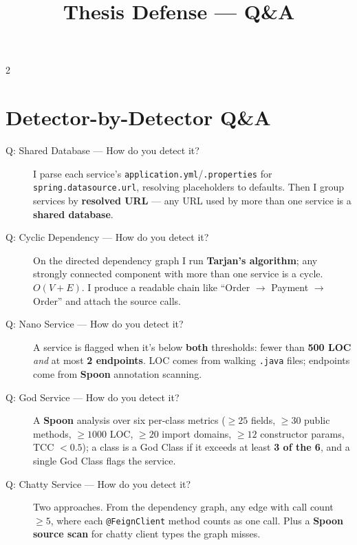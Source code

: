 \documentclass[10pt,a4paper]{article}
\title{\textbf{Thesis Defense --- Q\&A}}
\author{}
\date{}
\begin{document}
\maketitle

\vspace{0.5em}

\begin{multicols}{2}

\section{Detector-by-Detector Q\&A}

\begin{description}
    \item[Q: Shared Database --- How do you detect it?]
    I parse each service's \texttt{application.yml}/\texttt{.properties} for \texttt{spring.datasource.url}, resolving placeholders to defaults. Then I group services by \textbf{resolved URL} --- any URL used by more than one service is a \textbf{shared database}.

    \item[Q: Cyclic Dependency --- How do you detect it?]
    On the directed dependency graph I run \textbf{Tarjan's algorithm}; any strongly connected component with more than one service is a cycle.  \(O(V+E)\). I produce a readable chain like ``Order \(\rightarrow\) Payment \(\rightarrow\) Order'' and attach the source calls.

    \item[Q: Nano Service --- How do you detect it?]
    A service is flagged when it's below \textbf{both} thresholds: fewer than \textbf{500 LOC} \emph{and} at most \textbf{2 endpoints}. LOC comes from walking \texttt{.java} files; endpoints come from \textbf{Spoon} annotation scanning.

    \item[Q: God Service --- How do you detect it?]
    A \textbf{Spoon} analysis over six per-class metrics (\(\geq 25\) fields, \(\geq 30\) public methods, \(\geq 1000\) LOC, \(\geq 20\) import domains, \(\geq 12\) constructor params, TCC \(< 0.5\)); a class is a God Class if it exceeds at least \textbf{3 of the 6}, and a single God Class flags the service.

    \item[Q: Chatty Service --- How do you detect it?]
    Two approaches. From the dependency graph, any edge with call count \(\geq 5\), where each \texttt{@FeignClient} method counts as one call. Plus a \textbf{Spoon source scan} for chatty client types the graph misses.


\end{description}
\end{multicols}
\end{document}
